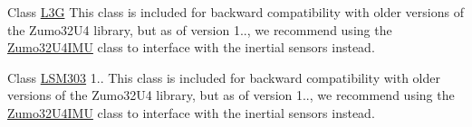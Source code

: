 
\begin{DoxyRefList}
\item[Class \mbox{\hyperlink{class_l3_g}{L3G}} ]\label{deprecated__deprecated000002}%
%
This class is included for backward compatibility with older versions of the Zumo32\+U4 library, but as of version 1.., we recommend using the \mbox{\hyperlink{class_zumo32_u4_i_m_u}{Zumo32\+U4\+IMU}} class to interface with the inertial sensors instead. 
\item[Class \mbox{\hyperlink{class_l_s_m303}{LSM303}} ]\label{deprecated__deprecated000001}%
%
1.. This class is included for backward compatibility with older versions of the Zumo32\+U4 library, but as of version 1.., we recommend using the \mbox{\hyperlink{class_zumo32_u4_i_m_u}{Zumo32\+U4\+IMU}} class to interface with the inertial sensors instead.
\end{DoxyRefList}